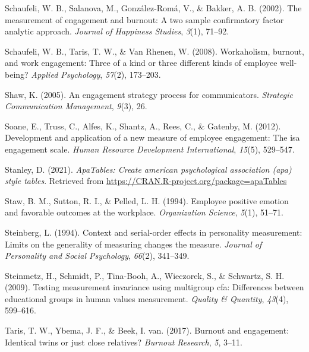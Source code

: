 \documentclass[
  english,
  man]{apa6}
\begin{document}
\leavevmode\hypertarget{ref-schaufeli_measurement_2002}{}%
Schaufeli, W. B., Salanova, M., González-Romá, V., \& Bakker, A. B. (2002). The measurement of engagement and burnout: A two sample confirmatory factor analytic approach. \emph{Journal of Happiness Studies}, \emph{3}(1), 71--92.

\leavevmode\hypertarget{ref-schaufeli2008workaholism}{}%
Schaufeli, W. B., Taris, T. W., \& Van Rhenen, W. (2008). Workaholism, burnout, and work engagement: Three of a kind or three different kinds of employee well-being? \emph{Applied Psychology}, \emph{57}(2), 173--203.

\leavevmode\hypertarget{ref-shaw2005engagement}{}%
Shaw, K. (2005). An engagement strategy process for communicators. \emph{Strategic Communication Management}, \emph{9}(3), 26.

\leavevmode\hypertarget{ref-soane2012development}{}%
Soane, E., Truss, C., Alfes, K., Shantz, A., Rees, C., \& Gatenby, M. (2012). Development and application of a new measure of employee engagement: The isa engagement scale. \emph{Human Resource Development International}, \emph{15}(5), 529--547.

\leavevmode\hypertarget{ref-R-apaTables}{}%
Stanley, D. (2021). \emph{ApaTables: Create american psychological association (apa) style tables}. Retrieved from \url{https://CRAN.R-project.org/package=apaTables}

\leavevmode\hypertarget{ref-staw_employee_1994}{}%
Staw, B. M., Sutton, R. I., \& Pelled, L. H. (1994). Employee positive emotion and favorable outcomes at the workplace. \emph{Organization Science}, \emph{5}(1), 51--71.

\leavevmode\hypertarget{ref-steinberg1994context}{}%
Steinberg, L. (1994). Context and serial-order effects in personality measurement: Limits on the generality of measuring changes the measure. \emph{Journal of Personality and Social Psychology}, \emph{66}(2), 341--349.

\leavevmode\hypertarget{ref-steinmetz2009testing}{}%
Steinmetz, H., Schmidt, P., Tina-Booh, A., Wieczorek, S., \& Schwartz, S. H. (2009). Testing measurement invariance using multigroup cfa: Differences between educational groups in human values measurement. \emph{Quality \& Quantity}, \emph{43}(4), 599--616.

\leavevmode\hypertarget{ref-taris2017burnout}{}%
Taris, T. W., Ybema, J. F., \& Beek, I. van. (2017). Burnout and engagement: Identical twins or just close relatives? \emph{Burnout Research}, \emph{5}, 3--11.
\end{document}
